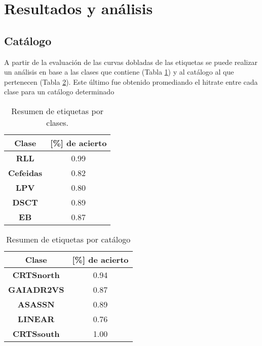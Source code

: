 \newpage
\section{Resultados y análisis}

    \subsection{Catálogo}
    
    A partir de la evaluación de las curvas dobladas de las etiquetas se puede realizar un análisis en base a las clases que contiene (Tabla \ref{tab:catClass}) y al catálogo al que pertenecen (Tabla \ref{tab:catCat}). Este último fue obtenido promediando el hitrate entre cada clase para un catálogo determinado
	\begin{multicols}{2}

	\begin{table}
		\centering
		\caption{Resumen de etiquetas por clases.}
		\begin{tabular}{cc}
			\hline
			\textbf{Clase}      & \textbf{[\%] de acierto} \bigstrut\\
			\hline
			\textbf{RLL}        & 0.99 \bigstrut[t]\\
			\textbf{Cefeidas}   & 0.82 \\
			\textbf{LPV}        & 0.80  \\
			\textbf{DSCT}       & 0.89 \\
			\textbf{EB}         & 0.87 \bigstrut[b] \\
			\hline
		\end{tabular}
		\label{tab:catClass}
	\end{table}
	
		\begin{table}
		\centering
		\caption{Resumen de etiquetas por catálogo}
		\begin{tabular}{cc}
			\hline
			\textbf{Clase}      & \textbf{[\%] de acierto} \bigstrut\\
			\hline
			\textbf{CRTSnorth}  & 0.94 \bigstrut[t]\\
			\textbf{GAIADR2VS}  & 0.87 \\
			\textbf{ASASSN}     & 0.89 \\
			\textbf{LINEAR}     & 0.76 \\
			\textbf{CRTSsouth}  & 1.00 \bigstrut[b] \\
			\hline
		\end{tabular}
		\label{tab:catCat}
	\end{table}
	\end{multicols}    
	
